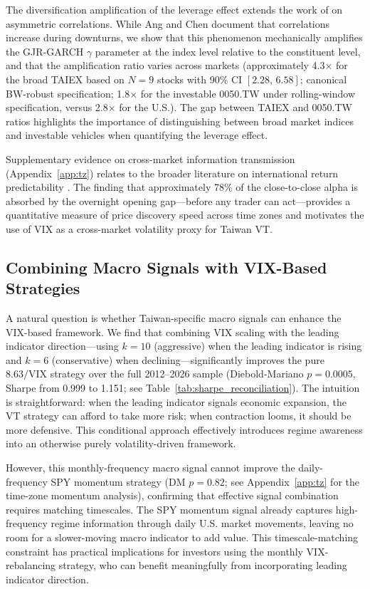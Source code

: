 The diversification amplification of the leverage effect extends the work of \citet{ang2002} on asymmetric correlations. While Ang and Chen document that correlations increase during downturns, we show that this phenomenon mechanically amplifies the GJR-GARCH $\gamma$ parameter at the index level relative to the constituent level, and that the amplification ratio varies across markets (approximately 4.3$\times$ for the broad TAIEX based on $N = 9$ stocks with 90\% CI $[2.28, \, 6.58]$; canonical BW-robust specification; 1.8$\times$ for the investable 0050.TW under rolling-window specification, versus 2.8$\times$ for the U.S.). The gap between TAIEX and 0050.TW ratios highlights the importance of distinguishing between broad market indices and investable vehicles when quantifying the leverage effect.

Supplementary evidence on cross-market information transmission (Appendix~\ref{app:tz}) relates to the broader literature on international return predictability \citep{eun1989,rapach2013}. The finding that approximately 78\% of the close-to-close alpha is absorbed by the overnight opening gap---before any trader can act---provides a quantitative measure of price discovery speed across time zones and motivates the use of VIX as a cross-market volatility proxy for Taiwan VT.

\subsection{Combining Macro Signals with VIX-Based Strategies}

A natural question is whether Taiwan-specific macro signals can enhance the VIX-based framework. We find that combining VIX scaling with the leading indicator direction---using $k = 10$ (aggressive) when the leading indicator is rising and $k = 6$ (conservative) when declining---significantly improves the pure $8.63/\text{VIX}$ strategy over the full 2012--2026 sample (Diebold-Mariano $p = 0.0005$, Sharpe from 0.999 to 1.151; see Table~\ref{tab:sharpe_reconciliation}). The intuition is straightforward: when the leading indicator signals economic expansion, the VT strategy can afford to take more risk; when contraction looms, it should be more defensive. This conditional approach effectively introduces regime awareness into an otherwise purely volatility-driven framework.

However, this monthly-frequency macro signal cannot improve the daily-frequency SPY momentum strategy (DM $p = 0.82$; see Appendix~\ref{app:tz} for the time-zone momentum analysis), confirming that effective signal combination requires matching timescales. The SPY momentum signal already captures high-frequency regime information through daily U.S. market movements, leaving no room for a slower-moving macro indicator to add value. This timescale-matching constraint has practical implications for investors using the monthly VIX-rebalancing strategy, who can benefit meaningfully from incorporating leading indicator direction.


